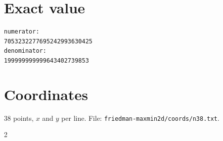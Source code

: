 \documentclass[11pt,a4paper]{article}
\begin{document}
\appendix
\section{Exact value}
{\small
\begin{verbatim}
numerator:
7053232277695242993630425
denominator:
199999999999643402739853
\end{verbatim}}

\section{Coordinates}
38 points, $x$ and $y$ per line. File: \texttt{friedman-maxmin2d/coords/n38.txt}.
{\tiny
\begin{multicols}{2}
\end{multicols}}
\end{document}
